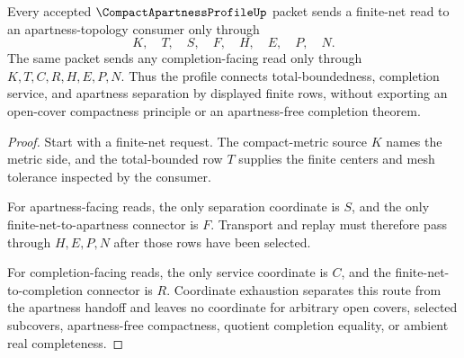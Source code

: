 \begin{theorem}
\label{thm:compact-apartness-profile-finite-net-apartness-handoff}
Every accepted $\CompactApartnessProfileUp$ packet sends a finite-net read to an apartness-topology consumer only through
$$
K,\quad T,\quad S,\quad F,\quad H,\quad E,\quad P,\quad N.
$$
The same packet sends any completion-facing read only through $K,T,C,R,H,E,P,N$. Thus the profile connects total-boundedness, completion service, and apartness separation by displayed finite rows, without exporting an open-cover compactness principle or an apartness-free completion theorem.
\end{theorem}
\begin{proof}
Start with a finite-net request. The compact-metric source $K$ names the metric side, and the total-bounded row $T$ supplies the finite centers and mesh tolerance inspected by the consumer.

For apartness-facing reads, the only separation coordinate is $S$, and the only finite-net-to-apartness connector is $F$. Transport and replay must therefore pass through $H,E,P,N$ after those rows have been selected.

For completion-facing reads, the only service coordinate is $C$, and the finite-net-to-completion connector is $R$. Coordinate exhaustion separates this route from the apartness handoff and leaves no coordinate for arbitrary open covers, selected subcovers, apartness-free compactness, quotient completion equality, or ambient real completeness.
\end{proof}


\begin{closurestatus}{\CompactApartnessProfileUp}
  \theoryclosure{\seedClosure}
  \formalstatus{\unformalizedV}
\end{closurestatus}

